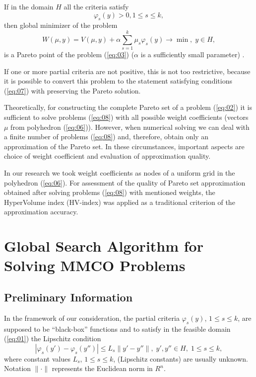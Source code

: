 \documentclass[runningheads]{llncs}
\begin{document}
If in the domain $H$ all the criteria satisfy
\begin{equation}
    \label{eq:07}
    \varphi_s(y) > 0, 1 \leq s \leq k,
\end{equation}
then global minimizer of the problem
\begin{equation}
    \label{eq:08}
    W(\mu, y) = V(\mu, y) + \alpha \sum_{s=1}^k \mu_s \varphi_s(y) \to \min, \; y \in H,
\end{equation}
is a Pareto point of the problem (\ref{eq:03}) ($\alpha$  is a sufficiently small parameter) \cite{Wierzbicki,Marler2004}.

If one or more partial criteria are not positive, this is not too restrictive, because it is possible to convert this problem to the statement satisfying conditions (\ref{eq:07}) with preserving the Pareto solution.

Theoretically, for constructing the complete Pareto set of a problem (\ref{eq:02}) it is sufficient to solve problems (\ref{eq:08}) with all possible weight coefficients (vectors $\mu$ from polyhedron (\ref{eq:06})). However, when numerical solving we can deal with a finite number of problems (\ref{eq:08}) and, therefore, obtain only an approximation of the Pareto set. In these circumstances, important aspects are choice of weight coefficient and evaluation of approximation quality.

In our research we took weight coefficients as nodes of a uniform grid in the polyhedron (\ref{eq:06}). For assessment of the quality of Pareto set approximation obtained after solving problems (\ref{eq:08}) with mentioned weights, the HyperVolume index (HV-index) \cite{Evtushenko2014,Gergel2018} was applied as a traditional criterion of the approximation accuracy.


\section{Global Search Algorithm for Solving MMCO Problems}\label{sec:3}

\subsection{Preliminary Information}

In the framework of our consideration, the partial criteria $\varphi_s(y)$, $1 \leq s \leq k$, are supposed to be ``black-box'' functions and to satisfy in the feasible domain (\ref{eq:01}) the Lipschitz condition
\begin{equation}
    \label{eq:09}
    |\varphi_s(y') - \varphi_s(y'')| \leq L_s \|y'-y''\|, \; y', y'' \in H, \; 1 \leq s \leq k,
\end{equation}
where constant values $L_s$, $1 \leq s \leq k$, (Lipschitz constants) are usually unknown. Notation $\| \cdot \|$ represents the Euclidean norm in $R^n$.  
\end{document}
